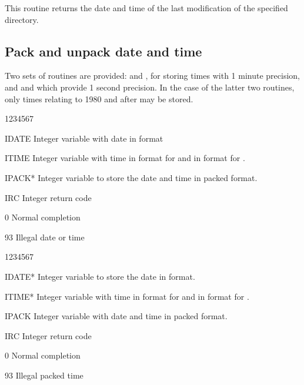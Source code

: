 This routine returns the date and time of the last modification of
the specified directory.

\subsection{Pack and unpack date and time}

Two sets of routines are provided:  and ,
for storing times with 1 minute precision, and 
and  which provide 1 second precision.
In the case of the latter two routines, only times
relating to 1980 and after may be stored.


\begin{DLtt}{1234567}
\item[IDATE] Integer variable with date in  format
\item[ITIME] Integer variable with time in  format for 
  and in  format for .
\item[IPACK*] Integer variable to store the date and time in packed format.
\item[IRC]Integer return code
  \begin{DLtt}{12}
    \item[0]Normal completion
    \item[93]Illegal date or time
  \end{DLtt}
\end{DLtt}

\begin{DLtt}{1234567}
\item[IDATE*] Integer variable to store the date in  format.
\item[ITIME*] Integer variable with time in  format for 
     and in  format for .
\item[IPACK] Integer variable with date and time in packed format.
\item[IRC]Integer return code
  \begin{DLtt}{12}
    \item[0]Normal completion
    \item[93]Illegal packed time
  \end{DLtt}
\end{DLtt}

